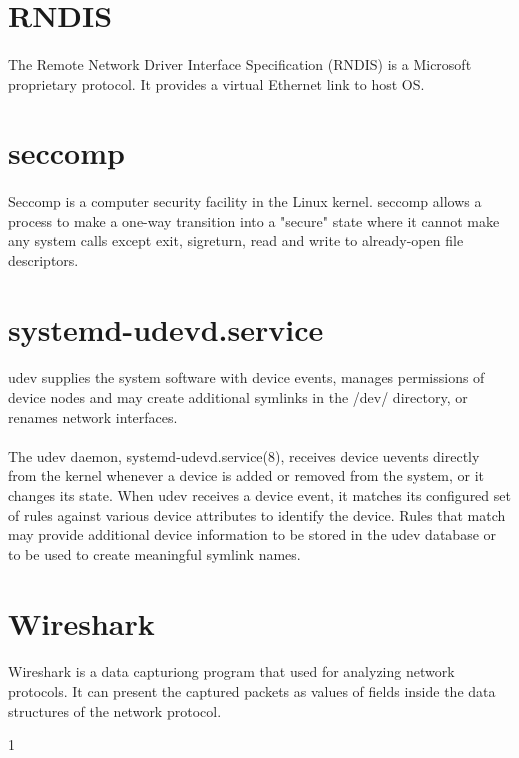 \documentclass[mscthesis]{usiinfthesis}
\begin{document}
\section{RNDIS}\label{sec:RNDIS}
\paragraph{}
The Remote Network Driver Interface Specification (RNDIS) is a Microsoft proprietary protocol. It provides a virtual Ethernet link to host OS.

\section{seccomp}\label{sec:seccomp}
\paragraph{}
Seccomp is a computer security facility in the Linux kernel. seccomp allows a process to make a one-way transition into a "secure" state where it cannot make any system calls except exit, sigreturn, read and write to already-open file descriptors.

\section{systemd-udevd.service}\label{sec:systemd-udevd.service}
\paragraph{}
udev supplies the system software with device events, manages permissions of device nodes and may create additional symlinks in the /dev/ directory, or renames network interfaces.
\paragraph{}
The udev daemon, systemd-udevd.service(8), receives device uevents directly from the kernel whenever a device is added or removed from the system, or it changes its state. When udev receives a device event, it matches its configured set of rules against various device attributes to identify the device. Rules that match may provide additional device information to be stored in the udev database or to be used to create meaningful symlink names.

\section{Wireshark}\label{sec:Wireshark}
\paragraph{}
Wireshark is a data capturiong program that used for analyzing network protocols. It can present the captured packets as values of fields inside the data structures of the network protocol.

%
%



1
\end{document}
